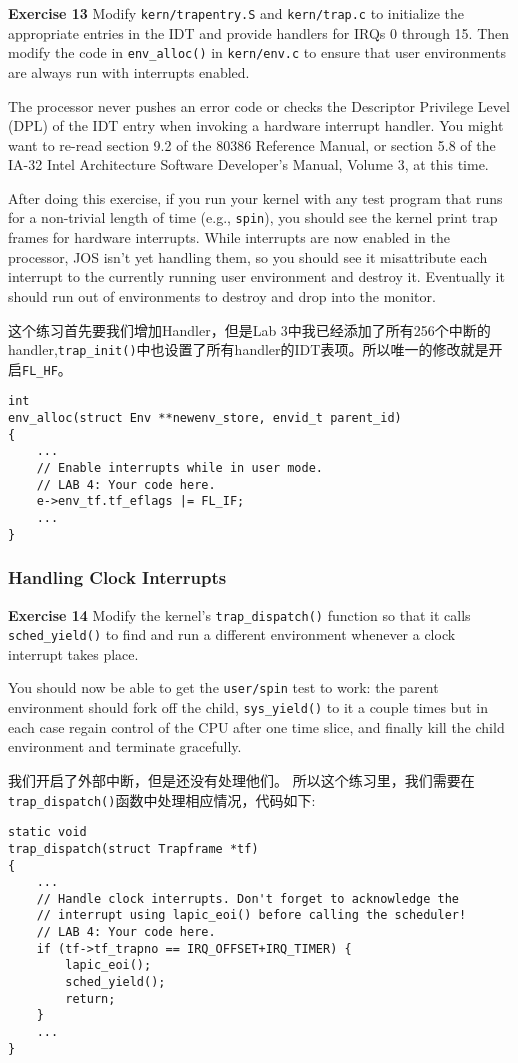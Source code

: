 \documentclass[11pt]{article}
\begin{document}
\begin{framed}
\noindent\textbf{Exercise 13} Modify \lstinline|kern/trapentry.S| and \lstinline|kern/trap.c| to initialize the appropriate entries in the IDT and provide handlers for IRQs 0 through 15. Then modify the code in \lstinline|env_alloc()| in \lstinline|kern/env.c| to ensure that user environments are always run with interrupts enabled.

The processor never pushes an error code or checks the Descriptor Privilege Level (DPL) of the IDT entry when invoking a hardware interrupt handler. You might want to re-read section 9.2 of the 80386 Reference Manual, or section 5.8 of the IA-32 Intel Architecture Software Developer's Manual, Volume 3, at this time.

After doing this exercise, if you run your kernel with any test program that runs for a non-trivial length of time (e.g., \lstinline|spin|), you should see the kernel print trap frames for hardware interrupts. While interrupts are now enabled in the processor, JOS isn't yet handling them, so you should see it misattribute each interrupt to the currently running user environment and destroy it. Eventually it should run out of environments to destroy and drop into the monitor.
\end{framed}
这个练习首先要我们增加Handler，但是Lab 3中我已经添加了所有256个中断的handler,\lstinline|trap_init()|中也设置了所有handler的IDT表项。所以唯一的修改就是开启\lstinline|FL_HF|。
\begin{lstlisting}[title=kern/env.c]
int
env_alloc(struct Env **newenv_store, envid_t parent_id)
{
	...
	// Enable interrupts while in user mode.
	// LAB 4: Your code here.
	e->env_tf.tf_eflags |= FL_IF;
	...
}
\end{lstlisting}

\subsubsection{Handling Clock Interrupts}
\begin{framed}
\noindent\textbf{Exercise 14} Modify the kernel's \lstinline|trap_dispatch()| function so that it calls \lstinline|sched_yield()| to find and run a different environment whenever a clock interrupt takes place.

You should now be able to get the \lstinline|user/spin| test to work: the parent environment should fork off the child, \lstinline|sys_yield()| to it a couple times but in each case regain control of the CPU after one time slice, and finally kill the child environment and terminate gracefully.
\end{framed}
我们开启了外部中断，但是还没有处理他们。 所以这个练习里，我们需要在\lstinline|trap_dispatch()|函数中处理相应情况，代码如下:
\begin{lstlisting}[title=kern/trap.c]
static void
trap_dispatch(struct Trapframe *tf)
{
	...
	// Handle clock interrupts. Don't forget to acknowledge the
	// interrupt using lapic_eoi() before calling the scheduler!
	// LAB 4: Your code here.
	if (tf->tf_trapno == IRQ_OFFSET+IRQ_TIMER) {
		lapic_eoi();
		sched_yield();
		return;
	}
	...
}
\end{lstlisting}
\end{document}
